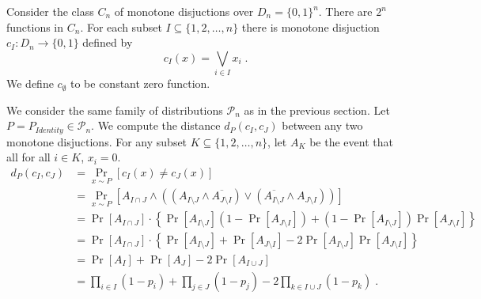 \documentclass[10pt]{article}
\renewcommand{\P}{\mathcal{P}}
\begin{document}
Consider the class $C_n$ of monotone disjuctions over $D_n = \{0,1\}^n$.
There are $2^n$ functions in $C_n$. For each subset $I \subseteq \{1,2,\dots,n\}$
there is monotone disjuction $c_I:D_n \to \{0,1\}$ defined by
$$
c_I(x) = \bigvee_{i \in I} x_i \; .
$$
We define $c_\emptyset$ to be constant zero function.

We consider the same family of distributions $\P_n$ as in the previous section.
Let $P = P_{Identity} \in \P_n$. We compute the distance $d_P(c_I, c_J)$
between any two monotone disjuctions. For any subset
$K \subseteq \{1,2,\dots,n\}$, let $A_K$ be the event that all for all $i \in K$, $x_i = 0$.
\begin{align*}
d_P(c_I, c_J)
& = \Pr_{x \sim P}[c_I(x) \neq c_J(x)] \\
& = \Pr_{x \sim P}[A_{I \cap J} \wedge ((A_{I \setminus J} \wedge \overline{A_{J \setminus I}}) \vee (\overline{A_{I \setminus J}} \wedge A_{J \setminus I} )) ] \\
& = \Pr[A_{I \cap J}] \cdot \left\{ \Pr[A_{I \setminus J}] (1 - \Pr[A_{J \setminus I}]) + (1 - \Pr[A_{I \setminus J}]) \Pr[A_{J \setminus I}] \right\} \\
& = \Pr[A_{I \cap J}] \cdot \left\{ \Pr[A_{I \setminus J}] + \Pr[A_{J \setminus I}] - 2 \Pr[A_{I \setminus J}] \Pr[A_{J \setminus I}] \right\} \\
& = \Pr[A_I] + \Pr[A_J] - 2 \Pr[A_{I \cup J}] \\
& = \prod_{i \in I} (1 - p_i) + \prod_{j \in J} (1 - p_j) - 2 \prod_{k \in I \cup J} (1 - p_k) \; . \\
\end{align*}



\end{document}
